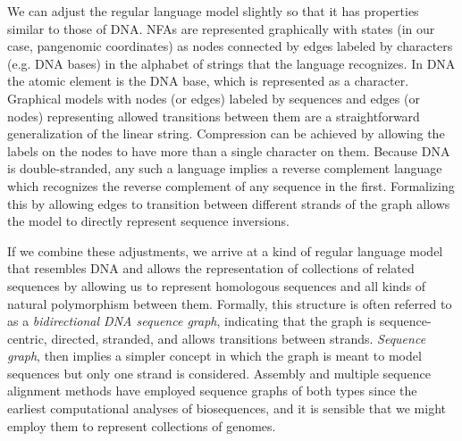 We can adjust the regular language model slightly so that it has properties similar to those of DNA.
NFAs are represented graphically with states (in our case, pangenomic coordinates) as nodes connected by edges labeled by characters (e.g. DNA bases) in the alphabet of strings that the language recognizes.
In DNA the atomic element is the DNA base, which is represented as a character.
Graphical models with nodes (or edges) labeled by sequences and edges (or nodes) representing allowed transitions between them are a straightforward generalization of the linear string.
Compression can be achieved by allowing the labels on the nodes to have more than a single character on them.
Because DNA is double-stranded, any such a language implies a reverse complement language which recognizes the reverse complement of any sequence in the first.
Formalizing this by allowing edges to transition between different strands of the graph allows the model to directly represent sequence inversions.

If we combine these adjustments, we arrive at a kind of regular language model that resembles DNA and allows the representation of collections of related sequences by allowing us to represent homologous sequences and all kinds of natural polymorphism between them.
Formally, this structure is often referred to as a \emph{bidirectional DNA sequence graph}, indicating that the graph is sequence-centric, directed, stranded, and allows transitions between strands.
\emph{Sequence graph}, then implies a simpler concept in which the graph is meant to model sequences but only one strand is considered.
Assembly and multiple sequence alignment methods have employed sequence graphs of both types since the earliest computational analyses of biosequences, and it is sensible that we might employ them to represent collections of genomes.

